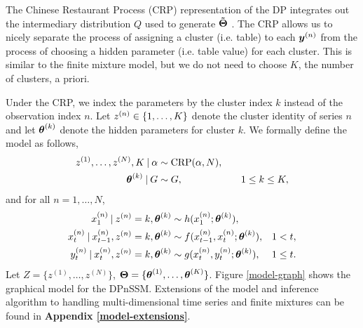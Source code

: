 \documentclass[twoside]{article}
\begin{document}
The Chinese Restaurant Process (CRP) representation of the DP integrates out the intermediary distribution $Q$ used to generate ${\bd{\tilde{\Theta}}}$ \citep{neal2000markov}.  The CRP allows us to nicely separate the process of assigning a cluster (i.e. table) to each $\bidx y n$ from the process of choosing a hidden parameter (i.e. table value) for each cluster.  This is similar to the finite mixture model, but we do not need to choose $K$, the number of clusters, a priori.

Under the CRP, we index the parameters by the cluster index $k$ instead of the observation index $n$.  Let $\idx z n \in \{1, \ldots, K\}$ denote the cluster identity of series $n$ and let $\idx {\bd{\theta}}  k$ denote the hidden parameters for cluster $k$. We formally define the model as follows,
\begin{align} \label{crp}
\idx z 1, \ldots, \idx z N, K \given \alpha &\sim \text{CRP}(\alpha, N), \\ 
\idx {\bd{\theta}}  k \given G &\sim G, & \quad 1 \leq k \leq K, \nonumber 
\end{align}
and for all $n = 1,\ldots,N$, 
\begin{align}
{\idx[1] x n} \given \idx z n = k, \idx {\bd{\theta}} k & \sim h(\idx[1] x n; \idx {\bd{\theta}} k), \nonumber \\ 
\idx[t] x n \given \idx[t-1] x n, \idx z n = k, \idx {\bd{\theta}} k &\sim f(\idx[t-1] x n, \idx[t] x n; \idx {\bd{\theta}}  k), & 1 < t, \nonumber \\  
\idx[t] y n \given \idx[t] x n, \idx z n = k, \idx {\bd{\theta}} k &\sim g(\idx[t] x n, \idx[t] y n; \idx {\bd{\theta}}  k), & 1 \leq t. \nonumber
\end{align}   
Let $Z = \{z^{(1)},\ldots,z^{(N)}\}$, $\bd \Theta = \{\bd \theta^{(1)},\ldots,\bd \theta^{(K)}\}$.  Figure \ref{model-graph} shows the graphical model for the DPnSSM.  Extensions of the model and inference algorithm to handling multi-dimensional time series and finite mixtures can be found in \textbf{Appendix \ref{model-extensions}}.
\end{document}
